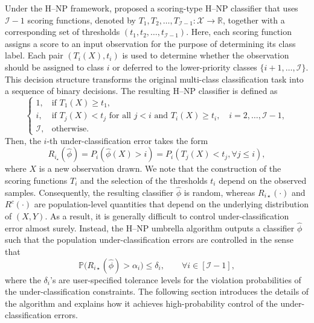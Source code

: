 Under the H--NP framework, \cite{wang2024hierarchical} proposed a scoring-type H--NP classifier that uses $\mathcal{I}-1$ scoring functions, denoted by $T_1, T_2, \ldots, T_{\mathcal{I}-1} : \mathcal{X} \to \mathbb{R}$, together with a corresponding set of thresholds $(t_1, t_2, \ldots, t_{\mathcal{I}-1})$. Here, each scoring function assigns a score to an input observation for the purpose of determining its class label. Each pair $(T_i(X), t_i)$ is used to determine whether the observation should be assigned to class $i$ or deferred to the lower-priority classes $\{i+1, \ldots, \mathcal{I}\}$. This decision structure transforms the original multi-class classification task into a sequence of binary decisions. The resulting H--NP classifier is defined as
\begin{equation}\label{eq:np_classifier_form}
\begin{cases}
1, & \text{if } T_1(X)\ge t_1,\\
i, & \text{if } T_j(X)<t_j \text{ for all } j<i \text{ and } T_i(X)\ge t_i,\quad i=2,\ldots,\mathcal{I}-1,\\
\mathcal{I}, & \text{otherwise.}
\end{cases}
\end{equation}
Then, the $i$-th under-classification error takes the form
\begin{equation}
R_{i_\star}(\hat{\phi}) = P_i\left(\hat{\phi}(X) > i \right) 
= P_i\left(T_j(X) < t_j, \forall j \leq i \right),\label{transform}
\end{equation}
where $X$ is a new observation drawn.  We note that the construction of the scoring functions $T_i$ and the selection of the thresholds $t_i$ depend on the observed samples. Consequently, the resulting classifier $\hat{\phi}$ is random, whereas $R_{i\star}(\cdot)$ and $R^c(\cdot)$ are population-level quantities that depend on the underlying distribution of $(X,Y)$. As a result, it is generally difficult to control under-classification error almost surely. Instead, the H--NP umbrella algorithm outputs a classifier \(\hat{\phi}\) such that the population under-classification errors are controlled in the sense that
\begin{equation}\label{eq:high_prob_control}
    \mathbb{P}\bigl(R_{i\star}(\hat{\phi}) > \alpha_i\bigr) \le \delta_i, \qquad \forall i \in [\mathcal{I}-1],
\end{equation}
where the $\delta_i$'s are user-specified tolerance levels for the violation probabilities of the under-classification constraints. The following section introduces the details of the algorithm and explains how it achieves high-probability control of the under-classification errors.




